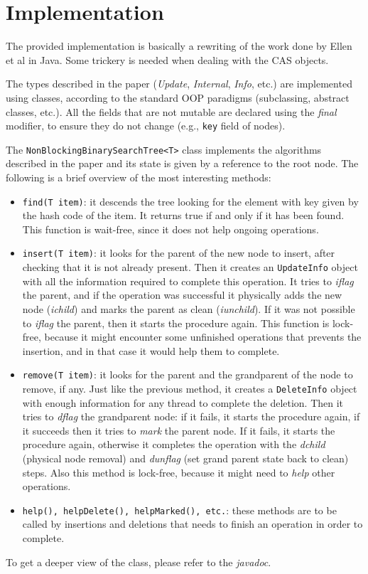 \documentclass[a4paper,draft,12pt]{article}
\begin{document}
\section{Implementation}
The provided implementation is basically a rewriting of the work done by Ellen et al in Java.
Some trickery is needed when dealing with the \ac{CAS} objects.

The types described in the paper (\emph{Update}, \emph{Internal}, \emph{Info}, etc.) are implemented using classes, according to the standard OOP paradigms (subclassing, abstract classes, etc.).
All the fields that are not mutable are declared using the \emph{final} modifier, to ensure they do not change (e.g., \texttt{key} field of nodes).

The \texttt{Non\-Blocking\-Binary\-Search\-Tree<T>} class implements the algorithms described in the paper and its state is given by a reference to the root node.
The following is a brief overview of the most interesting methods:
\begin{itemize}
    \item \texttt{find(T item)}: it descends the tree looking for the element with key given by the hash code of the item.
    It returns true if and only if it has been found.
    This function is wait-free, since it does not help ongoing operations.
    \item \texttt{insert(T item)}: it looks for the parent of the new node to insert, after checking that it is not already present.
    Then it creates an \texttt{UpdateInfo} object with all the information required to complete this operation.
    It tries to \emph{iflag} the parent, and if the operation was successful it physically adds the new node (\emph{ichild}) and marks the parent as clean (\emph{iunchild}).
    If it was not possible to \emph{iflag} the parent, then it starts the procedure again.
    This function is lock-free, because it might encounter some unfinished operations that prevents the insertion, and in that case it would help them to complete.
    \item \texttt{remove(T item)}: it looks for the parent and the grandparent of the node to remove, if any.
    Just like the previous method, it creates a \texttt{DeleteInfo} object with enough information for any thread to complete the deletion.
    Then it tries to \emph{dflag} the grandparent node: if it fails, it starts the procedure again, if it succeeds then it tries to \emph{mark} the parent node.
    If it fails, it starts the procedure again, otherwise it completes the operation with the \emph{dchild} (physical node removal) and \emph{dunflag} (set grand parent state back to clean) steps.
    Also this method is lock-free, because it might need to \emph{help} other operations.
    \item \texttt{help(), helpDelete(), helpMarked(), etc.}: these methods are to be called by insertions and deletions that needs to finish an operation in order to complete.
\end{itemize}
To get a deeper view of the class, please refer to the \emph{javadoc}.
\end{document}
